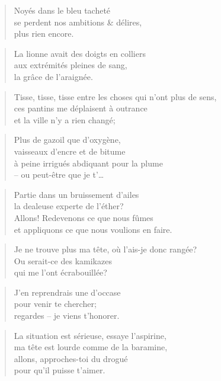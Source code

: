   \begin{verse}
    Noyés dans le bleu tacheté\\
    se perdent nos ambitions \& délires,\\
    plus rien encore.
  \end{verse}
  \begin{verse}
    La lionne avait des doigts en colliers\\
    aux extrémités pleines de sang,\\
    la grâce de l’araignée.
  \end{verse}
  \begin{verse}
    Tisse, tisse, tisse entre les choses qui n’ont plus de sens,\\
    ces pantins me déplaisent à outrance\\
    et la ville n’y a rien changé;
  \end{verse}
  \begin{verse}
    Plus de gazoil que d’oxygène,\\
    vaisseaux d’encre et de bitume\\
    à peine irrigués abdiquant pour la plume\\
    -- ou peut-être que je t’…
  \end{verse}
  \begin{verse}
    Partie dans un bruissement d’ailes\\
    la dealeuse experte de l’éther?\\
    Allons! Redevenons ce que nous fûmes\\
    et appliquons ce que nous voulions en faire.
  \end{verse}
  \begin{verse}
    Je ne trouve plus ma tête, où l’ais-je donc rangée?\\
    Ou serait-ce des kamikazes\\
    qui me l’ont écrabouillée?
  \end{verse}
  \begin{verse}
    J’en reprendrais une d’occase\\
    pour venir te chercher;\\
    regardes -- je viens t’honorer.
  \end{verse}
  \begin{verse}
    La situation est sérieuse, essaye l’aspirine,\\
    ma tête est lourde comme de la baramine,\\
    allons, approches-toi du drogué\\
    pour qu’il puisse t’aimer.
  \end{verse}
